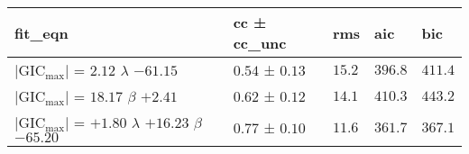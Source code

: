 \begin{tabular}{lllll}
\toprule
fit_eqn & cc ± cc_unc & rms & aic & bic \\
\midrule
$\vert{\text{GIC}_\text{max}}\vert$ = $2.12$ $\lambda$ $-61.15$ & $0.54$ ± $0.13$ & $15.2$ & $396.8$ & $411.4$ \\
$\vert{\text{GIC}_\text{max}}\vert$ = $18.17$ $\beta$ $+2.41$ & $0.62$ ± $0.12$ & $14.1$ & $410.3$ & $443.2$ \\
$\vert{\text{GIC}_\text{max}}\vert$ = $+1.80$ $\lambda$ $+16.23$ $\beta$ $-65.20$ & $0.77$ ± $0.10$ & $11.6$ & $361.7$ & $367.1$ \\
\bottomrule
\end{tabular}

